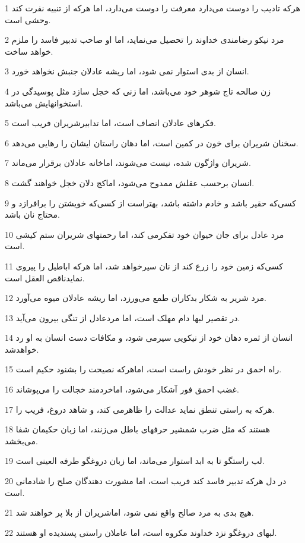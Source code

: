 \par 1 هر‌که تادیب را دوست می‌دارد معرفت را دوست می‌دارد، اما هر‌که از تنبیه نفرت کند وحشی است.
\par 2 مرد نیکو رضامندی خداوند را تحصیل می‌نماید، اما او صاحب تدبیر فاسد را ملزم خواهد ساخت.
\par 3 انسان از بدی استوار نمی شود، اما ریشه عادلان جنبش نخواهد خورد.
\par 4 زن صالحه تاج شوهر خود می‌باشد، اما زنی که خجل سازد مثل پوسیدگی در استخوانهایش می‌باشد.
\par 5 فکرهای عادلان انصاف است، اما تدابیرشریران فریب است.
\par 6 سخنان شریران برای خون در کمین است، اما دهان راستان ایشان را رهایی می‌دهد.
\par 7 شریران واژگون شده، نیست می‌شوند، اماخانه عادلان برقرار می‌ماند.
\par 8 انسان برحسب عقلش ممدوح می‌شود، اماکج دلان خجل خواهند گشت.
\par 9 کسی‌که حقیر باشد و خادم داشته باشد، بهتراست از کسی‌که خویشتن را برافرازد و محتاج نان باشد.
\par 10 مرد عادل برای جان حیوان خود تفکرمی کند، اما رحمتهای شریران ستم کیشی است.
\par 11 کسی‌که زمین خود را زرع کند از نان سیرخواهد شد، اما هر‌که اباطیل را پیروی نمایدناقص العقل است.
\par 12 مرد شریر به شکار بدکاران طمع می‌ورزد، اما ریشه عادلان میوه می‌آورد.
\par 13 در تقصیر لبها دام مهلک است، اما مردعادل از تنگی بیرون می‌آید.
\par 14 انسان از ثمره دهان خود از نیکویی سیرمی شود، و مکافات دست انسان به او رد خواهدشد.
\par 15 راه احمق در نظر خودش راست است، اماهر‌که نصیحت را بشنود حکیم است.
\par 16 غضب احمق فور آشکار می‌شود، اماخردمند خجالت را می‌پوشاند.
\par 17 هر‌که به راستی تنطق نماید عدالت را ظاهرمی کند، و شاهد دروغ، فریب را.
\par 18 هستند که مثل ضرب شمشیر حرفهای باطل می‌زنند، اما زبان حکیمان شفا می‌بخشد.
\par 19 لب راستگو تا به ابد استوار می‌ماند، اما زبان دروغگو طرفه العینی است.
\par 20 در دل هر‌که تدبیر فاسد کند فریب است، اما مشورت دهندگان صلح را شادمانی است.
\par 21 هیچ بدی به مرد صالح واقع نمی شود، اماشریران از بلا پر خواهند شد.
\par 22 لبهای دروغگو نزد خداوند مکروه است، اما عاملان راستی پسندیده او هستند.

